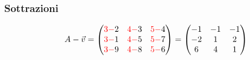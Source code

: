 \subsubsection{Sottrazioni}
\label{sec:sottvectmtx}
\begin{eqnarray*}
   A-\vec{v} =
  \begin{pmatrix}
    {\color{red}3-}2 & {\color{red}4-}3 & {\color{red}5-}4\\
    {\color{red}3-}1 & {\color{red}4-}5 & {\color{red}5-}7\\
    {\color{red}3-}9 & {\color{red}4-}8 & {\color{red}5-}6        
  \end{pmatrix}=
  \begin{pmatrix}
    -1 & -1 & -1\\
    -2 & 1 & 2 \\
    6 & 4 & 1
  \end{pmatrix}
\end{eqnarray*}

